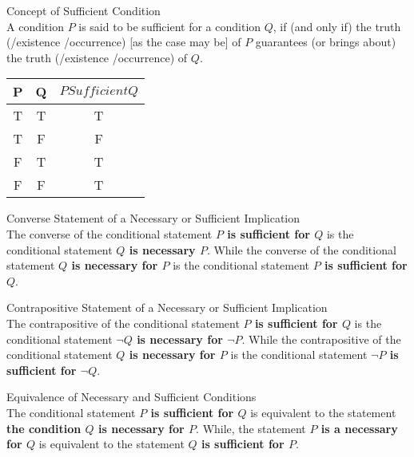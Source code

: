 \begin{definition}
Concept of Sufficient Condition \\
A condition $P$ is said to be sufficient for a condition $Q$, if (and only if) the truth (/existence /occurrence) [as the case may be] of $P$ guarantees (or brings about) the truth (/existence /occurrence) of $Q$.

\begin{center}
\begin{tabular}{|c|c|c|}
\hline 
P & Q & $P Sufficient Q$ \\ 
\hline 
T & T & T \\ 
\hline 
T & F & F \\ 
\hline 
F & T & T \\ 
\hline 
F & F & T \\ 
\hline 
\end{tabular} 
\end{center}
\end{definition}


\begin{definition}
Converse Statement of a Necessary or Sufficient Implication \\

The converse of the conditional statement {\bf $P$ is sufficient for $Q$} is the conditional statement {\bf $Q$ is necessary $P$}. While the converse of the conditional statement {\bf $Q$ is necessary for $P$} is the conditional statement {\bf $P$ is sufficient for $Q$}.
\end{definition}


\begin{definition}
Contrapositive Statement of a Necessary or Sufficient Implication \\

The contrapositive of the conditional statement {\bf $P$ is sufficient for $Q$} is the conditional statement {\bf $\neg Q$ is necessary for  $\neg P$}. While the contrapositive of the conditional statement {\bf $Q$ is necessary for $P$} is the conditional statement {\bf $\neg P$ is sufficient for $\neg Q$}. 
\end{definition}



\begin{definition}
Equivalence of Necessary and Sufficient Conditions \\
The conditional statement {\bf $P$ is sufficient for $Q$} is equivalent to the statement {\bf the condition $Q$ is necessary for $P$}. While, the statement {\bf $P$ is a necessary for $Q$} is equivalent to the statement {\bf $Q$ is sufficient for $P$}. \\
\end{definition}


